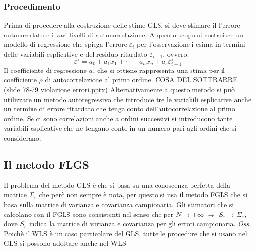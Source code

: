 \documentclass[]{article}
\begin{document}
\subsubsection{Procedimento}
Prima di procedere alla costruzione delle stime GLS,  si deve stimare il l'errore autocorrelato e i vari livelli di autocorrelazione. A questo scopo si costruisce un modello di regressione che spiega l'errore $\varepsilon_i$ per l'osservazione i-esima in termini delle variabili esplicative e del residuo ritardato $\varepsilon_{i-1}$, ovvero:
\begin{equation}
	\varepsilon^\circ = a_0 + a_1x_1 + \cdots + a_n x_n + a_\varepsilon \varepsilon_{i-1}^\circ
\end{equation}
Il coefficiente di regressione $a_\varepsilon$ che si ottiene rappresenta una stima per il coefficiente $\rho$ di autocorrelazione al primo ordine.
COSA DEL SOTTRARRE (slide 78-79 violazione errori.pptx)
Alternativamente a questo metodo si può utilizzare un metodo autoregressivo che introduce tre le variabili esplicative anche un termine di errore ritardato che tenga conto dell'autocorrelazione al primo ordine. Se ci sono correlazioni anche a ordini successivi si introducono tante variabili esplicative che ne tengano conto in un numero pari agli ordini che si considerano.
\subsection{Il metodo FLGS}
Il problema del metodo GLS è che si basa su una conoscenza perfetta della matrice $\Sigma_\varepsilon$ che però non sempre è nota, per questo si usa il metodo FGLS che si basa sulla matrice di varianza e covarianza campionaria. Gli stimatori che si calcolano con il FGLS sono consistenti nel senso che per $N \rightarrow +\infty \; \Rightarrow \; S_\varepsilon \rightarrow \Sigma_\varepsilon$, dove $S_\varepsilon$ indica la matrice di varianza e covarianza per gli errori campionaria.
\textit{Oss.}\\
Poichè il WLS è un caso particolare del GLS, tutte le procedure che si usano nel GLS si possono adottare anche nel WLS.
\end{document}
